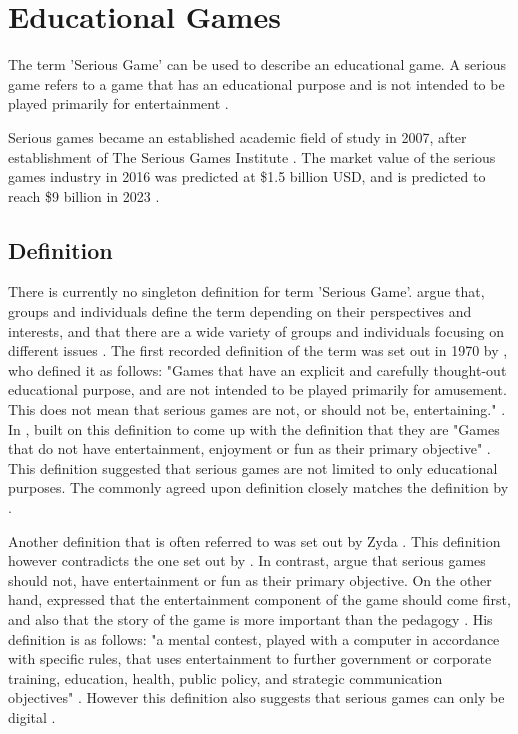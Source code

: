 \documentclass[a4paper,11.5pt]{report}
\numberwithin{figure}{section}
\numberwithin{table}{section}
\numberwithin{equation}{section}
\numberwithin{equation}{section}
\begin{document}

\section{Educational Games}

The term 'Serious Game' can be used to describe an educational game. A serious game refers to a game that has an educational purpose and is not intended to be played primarily for entertainment \citep{abt1970}. 

Serious games became an established academic field of study in 2007, after establishment of The Serious Games Institute \citep{Wilkinson2016}. The market value of the serious games industry in 2016 was predicted at \$1.5 billion USD, and is predicted to reach \$9 billion in 2023 \citep{alliedmarketresearch}.

\subsection{Definition}

There is currently no singleton definition for term 'Serious Game'. \citeauthor{Johann2015} argue that, groups and individuals define the term depending on their perspectives and interests, and that there are a wide variety of groups and individuals focusing on different issues \citep{Johann2015}. The first recorded definition of the term was set out in 1970 by \citeauthor{abt1970} \citep{Wilkinson2016}, who defined it as follows: "Games that have an explicit and carefully thought-out educational purpose, and are not intended to be played primarily for amusement. This does not mean that serious games are not, or should not be, entertaining." \citep{abt1970}. In \citeyear{Michael2005}, \citeauthor{Michael2005} built on this definition to come up with the definition that they are "Games that do not have entertainment, enjoyment or fun as their primary objective" \citep{Michael2005}. This definition suggested that serious games are not limited to only educational purposes. The commonly agreed upon definition closely matches the definition by \citeauthor{Michael2005} \citep[see][]{Johann2015}.

Another definition that is often referred to was set out by Zyda \citep[see][]{Johann2015}. This definition however contradicts the one set out by \citeauthor{Michael2005} \citep{Johann2015}. In contrast, \citeauthor{Michael2005} argue that serious games should not, have entertainment or fun as their primary objective. On the other hand, \citeauthor{Zyda2005} expressed that the entertainment component of the game should come first, and also that the story of the game is more important than the pedagogy \citep{Zyda2005}. His definition is as follows: "a mental contest, played with a computer in accordance with specific rules, that uses entertainment to further government or corporate training, education, health, public policy, and strategic communication objectives" \citep{Zyda2005}. However this definition also suggests that serious games can only be digital \citep{Jean}. 
\end{document}
